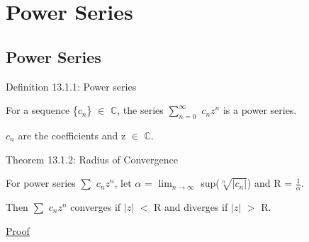 \newpage

\section[Day 13: Power Series]
{Power Series}

\subsection{ Power Series }

{ \color{blue} Definition 13.1.1: Power series }

    \begin{adjustbox}{minipage=14cm, right, vspace=0.1cm 0cm}
        For a sequence \{$c_n$\} $\in$ $\mathbb{C}$, the series
        $\sum_{n=0}^{\infty}$ $c_n z^n$
        is a power series.

        $c_n$ are the coefficients and z $\in$ $\mathbb{C}$.
    \end{adjustbox}

    \vspace{0.5cm}

{ \color{red} Theorem 13.1.2: Radius of Convergence }

    \begin{adjustbox}{minipage=14cm, right, vspace=0.1cm 0cm}
        For power series $\sum$ $c_n z^n$, let
        $\alpha$ = $\lim_{n \rightarrow \infty}$ sup($\sqrt[n]{|c_n|}$)
        and R = $\frac{1}{\alpha}$.

        Then $\sum$ $c_n z^n$ converges if $|z|$ $<$ R and
        diverges if $|z|$ $>$ R.
    \end{adjustbox}

{ \color{magenta} \underline{Proof} }






